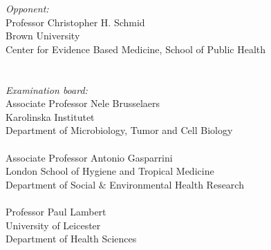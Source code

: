 \begin{minipage}[t]{7.25cm}
\singlespacing
{\small
\textit{Opponent:}\\
Professor Christopher H. Schmid \\
Brown University \\
Center for Evidence Based Medicine, School of Public Health \\
\\
\\
\textit{Examination board:}\\
Associate Professor Nele Brusselaers \\
Karolinska Institutet \\
Department of Microbiology, Tumor and Cell Biology \\
\\
Associate Professor Antonio Gasparrini \\
London School of Hygiene and Tropical Medicine \\
Department of Social $\&$ Environmental Health Research \\
\\
Professor Paul Lambert \\
University of Leicester \\
Department of Health Sciences \\
}
\end{minipage}